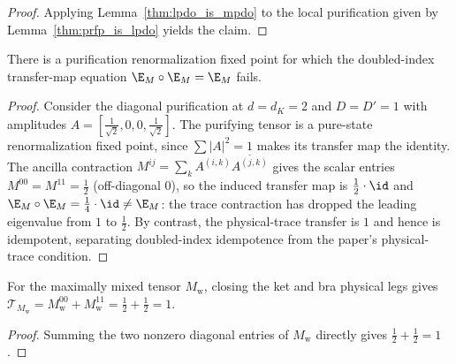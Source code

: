 \begin{proof}\leanok
    Applying Lemma~\ref{thm:lpdo_is_mpdo} to the local purification given by
    Lemma~\ref{thm:prfp_is_lpdo} yields the claim.
\end{proof}

\begin{lemma}
    \label{thm:prfp_not_doubled_index_zcl}
    \leanok
    There is a purification renormalization fixed point for which the
    doubled-index transfer-map equation $\E_M\circ\E_M=\E_M$ fails.
\end{lemma}

\begin{proof}\leanok
    Consider the diagonal purification at $d=d_K=2$ and $D=D'=1$ with
    amplitudes $A=[\tfrac{1}{\sqrt2},0,0,\tfrac{1}{\sqrt2}]$. The purifying
    tensor is a pure-state renormalization fixed point, since $\sum|A|^2=1$
    makes its transfer map the identity. The ancilla contraction
    $M^{ij}=\sum_k A^{(i,k)} \overline{A^{(j,k)}}$
    gives the scalar entries $M^{00}=M^{11}=\tfrac12$ (off-diagonal $0$), so the
    induced transfer map is $\tfrac12\cdot\id$ and
    $\E_M\circ\E_M=\tfrac14\cdot\id\neq\E_M$: the trace contraction has
    dropped the leading eigenvalue from $1$ to $\tfrac12$. By contrast, the
    physical-trace transfer is $1$ and hence is idempotent, separating
    doubled-index idempotence from the paper's physical-trace condition.
\end{proof}

\begin{lemma}
    \label{lem:phys_trace_transfer_witnessM}
    \leanok
    For the maximally mixed tensor $M_{\mathrm w}$, closing the ket and bra
    physical legs gives
    $\mathcal T_{M_{\mathrm w}}
        =M_{\mathrm w}^{00}+M_{\mathrm w}^{11}
        =\tfrac12+\tfrac12=1$.
\end{lemma}

\begin{proof}
    \leanok
    Summing the two nonzero diagonal entries of $M_{\mathrm w}$ directly gives
    $\tfrac12+\tfrac12=1$.
\end{proof}


